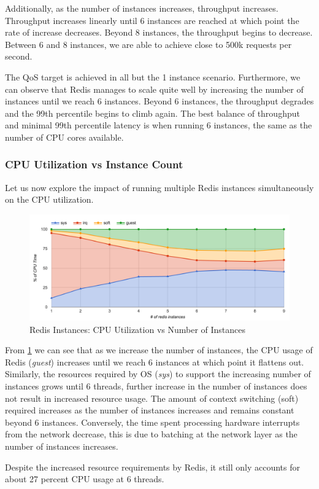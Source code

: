 Additionally, as the number of instances increases, throughput increases. Throughput increases linearly until 6 instances are reached at which point the rate of increase decreases. Beyond 8 instances, the throughput begins to decrease. Between 6 and 8 instances, we are able to achieve close to 500k requests per second.

The QoS target is achieved in all but the 1 instance scenario. Furthermore, we can observe that Redis manages to scale quite well by increasing the number of instances until we reach 6 instances. Beyond 6 instances, the throughput degrades and the 99th percentile begins to climb again. The best balance of throughput and minimal 99th percentile latency is when running 6 instances, the same as the number of CPU cores available.

\subsubsection{CPU Utilization vs Instance Count}
Let us now explore the impact of running multiple Redis instances simultaneously on the CPU utilization.

\begin{figure}[h]
    \includegraphics[width=\textwidth]{./res/6_instances_cpu.png}
    \caption{Redis Instances: CPU Utilization vs Number of Instances}
    \label{fig:6_instances_cpu.png}
\end{figure}

From \ref{fig:6_instances_cpu.png} we can see that as we increase the number of instances, the CPU usage of Redis (\textit{guest}) increases until we reach 6 instances at which point it flattens out. Similarly, the resources required by OS (\textit{sys}) to support the increasing number of instances grows until 6 threads, further increase in the number of instances does not result in increased resource usage. The amount of context switching (soft) required increases as the number of instances increases and remains constant beyond 6 instances. Conversely, the time spent processing hardware interrupts from the network decrease, this is due to batching at the network layer as the number of instances increases.

Despite the increased resource requirements by Redis, it still only accounts for about 27 percent CPU usage at 6 threads.


